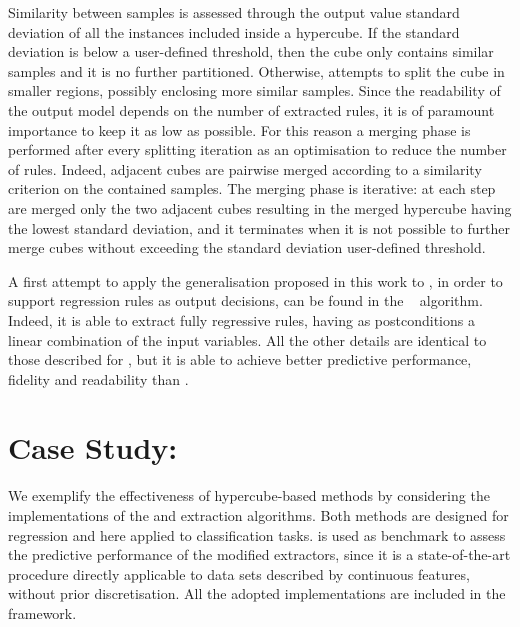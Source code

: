 \documentclass[
]{ceurart}
\begin{document}
Similarity between samples is assessed through the output value standard deviation of all the instances included inside a hypercube.
%
If the standard deviation is below a user-defined threshold, then the cube only contains similar samples and it is no further partitioned.
%
Otherwise, \gridex{} attempts to split the cube in smaller regions, possibly enclosing more similar samples.
%
Since the readability of the output model depends on the number of extracted rules, it is of paramount importance to keep it as low as possible.
%
For this reason a merging phase is performed after every splitting iteration as an optimisation to reduce the number of rules.
%
Indeed, adjacent cubes are pairwise merged according to a similarity criterion on the contained samples.
%
The merging phase is iterative: at each step are merged only the two adjacent cubes resulting in the merged hypercube having the lowest standard deviation, and it terminates when it is not possible to further merge cubes without exceeding the standard deviation user-defined threshold.

A first attempt to apply the generalisation proposed in this work to \gridex{}, in order to support regression rules as output decisions, can be found in the \gridrex{}~\cite{gridrex-kr2022} algorithm.
%
Indeed, it is able to extract fully regressive rules, having as postconditions a linear combination of the input variables.
%
All the other details are identical to those described for \gridex{}, but it is able to achieve better predictive performance, fidelity and readability than \gridex{}.

\section{Case Study: \psyke}\label{sec:experiments}

We exemplify the effectiveness of hypercube-based methods by considering the implementations of the \iter{} and \gridex{} extraction algorithms.
%
Both methods are designed for regression and here applied to classification tasks.
%
\cart{} is used as benchmark to assess the predictive performance of the modified extractors, since it is a state-of-the-art procedure directly applicable to data sets described by continuous features, without prior discretisation.
%
All the adopted implementations are included in the \psyke{} framework\footnotemark.

\end{document}
